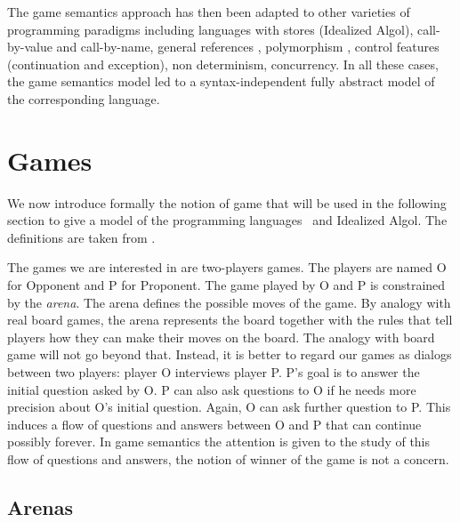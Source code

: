 The game semantics approach has then been adapted to other varieties of programming paradigms including languages with stores (Idealized Algol), call-by-value \citep{honda99gametheoretic,abramsky98callbyvalue} and call-by-name, general references \citep{DBLP:conf/lics/AbramskyHM98}, polymorphism
\citep{DBLP:journals/apal/AbramskyJ05}, control features
(continuation and exception), non determinism, concurrency. In all these cases, the game semantics model led to a syntax-independent fully abstract model of the corresponding language.

\section{Games}
\label{sec:catgames}

We now introduce formally the notion of game that will be used in
the following section to give a model of the programming languages
\pcf\ and Idealized Algol. The definitions are taken from
\cite{abramsky:game-semantics-tutorial, hylandong_pcf,
abramsky94full}.

The games we are interested in are two-players games. The players
are named O for Opponent and P for Proponent. The game played by O
and P is constrained by the \emph{arena}. The arena defines the
possible moves of the game. By analogy with real board games, the
arena represents the board together with the rules that tell players
how they can make their moves on the board. The analogy with board
game will not go beyond that. Instead, it is better to regard our
games as dialogs between two players: player O interviews player P.
P's goal is to answer the initial question asked by O. P can also
ask questions to O if he needs more precision about O's initial
question. Again, O can ask further question to P. This induces a
flow of questions and answers between O and P that can continue
possibly forever. In game semantics the attention is given to the
study of this flow of questions and answers, the notion of winner of
the game is not a concern.

\subsection{Arenas}


